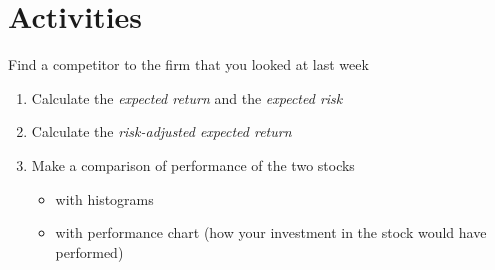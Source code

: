 \documentclass{article}
\begin{document}
\section*{Activities}
Find a competitor to the firm that you looked at last week
\begin{enumerate}
\item Calculate the \emph{expected return} and the \emph{expected risk}
\item Calculate the \emph{risk-adjusted expected return}
\item Make a comparison of performance of the two stocks
\begin{itemize}
\item with histograms
\item with performance chart (how your investment in the stock would have performed)
\end{itemize}
\end{enumerate}
\end{document}
